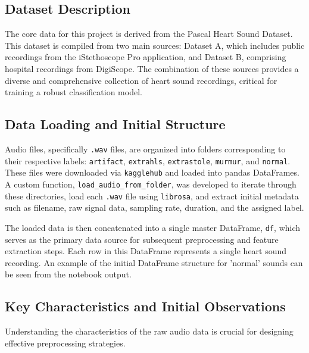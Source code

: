 \documentclass[a4paper]{article}
\begin{document}
\begin{multicols}{2}
\section{Dataset Description}
The core data for this project is derived from the Pascal Heart Sound Dataset. This dataset is compiled from two main sources: Dataset A, which includes public recordings from the iStethoscope Pro application, and Dataset B, comprising hospital recordings from DigiScope. The combination of these sources provides a diverse and comprehensive collection of heart sound recordings, critical for training a robust classification model.

\subsection{Data Loading and Initial Structure}
Audio files, specifically \texttt{.wav} files, are organized into folders corresponding to their respective labels: \texttt{artifact}, \texttt{extrahls}, \texttt{extrastole}, \texttt{murmur}, and \texttt{normal}. These files were downloaded via \texttt{kagglehub}  and loaded into pandas DataFrames. A custom function, \texttt{load\_audio\_from\_folder}, was developed to iterate through these directories, load each \texttt{.wav} file using \texttt{librosa}, and extract initial metadata such as filename, raw signal data, sampling rate, duration, and the assigned label.

The loaded data is then concatenated into a single master DataFrame, \texttt{df}, which serves as the primary data source for subsequent preprocessing and feature extraction steps. Each row in this DataFrame represents a single heart sound recording. An example of the initial DataFrame structure for 'normal' sounds can be seen from the notebook output.

\subsection{Key Characteristics and Initial Observations}
Understanding the characteristics of the raw audio data is crucial for designing effective preprocessing strategies.


\end{multicols}
\end{document}
